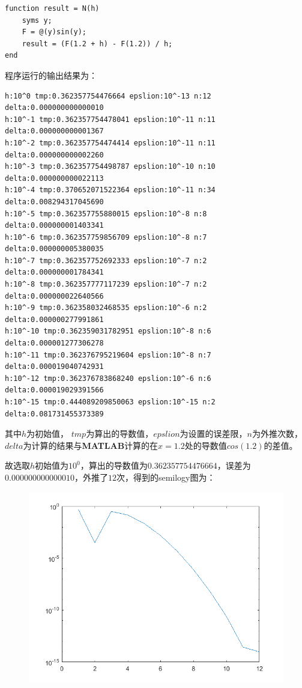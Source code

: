 \documentclass[12pt,a4paper,UTF8]{ctexart}
\theoremstyle{nonumberplain}
\begin{document}
\begin{enumerate}
\begin{enumerate}
\begin{lstlisting}[frame=single]
function result = N(h)
    syms y;
    F = @(y)sin(y);
    result = (F(1.2 + h) - F(1.2)) / h;
end
\end{lstlisting}
\par 程序运行的输出结果为：
\begin{lstlisting}[frame=single]
h:10^0 tmp:0.362357754476664 epslion:10^-13 n:12 delta:0.000000000000010
h:10^-1 tmp:0.362357754478041 epslion:10^-11 n:11 delta:0.000000000001367
h:10^-2 tmp:0.362357754474414 epslion:10^-11 n:11 delta:0.000000000002260
h:10^-3 tmp:0.362357754498787 epslion:10^-10 n:10 delta:0.000000000022113
h:10^-4 tmp:0.370652071522364 epslion:10^-11 n:34 delta:0.008294317045690
h:10^-5 tmp:0.362357755880015 epslion:10^-8 n:8 delta:0.000000001403341
h:10^-6 tmp:0.362357759856709 epslion:10^-8 n:7 delta:0.000000005380035
h:10^-7 tmp:0.362357752692333 epslion:10^-7 n:2 delta:0.000000001784341
h:10^-8 tmp:0.362357777117239 epslion:10^-7 n:2 delta:0.000000022640566
h:10^-9 tmp:0.362358032468535 epslion:10^-6 n:2 delta:0.000000277991861
h:10^-10 tmp:0.362359031782951 epslion:10^-8 n:6 delta:0.000001277306278
h:10^-11 tmp:0.362376795219604 epslion:10^-8 n:7 delta:0.000019040742931
h:10^-12 tmp:0.362376783868240 epslion:10^-6 n:6 delta:0.000019029391566
h:10^-15 tmp:0.444089209850063 epslion:10^-15 n:2 delta:0.081731455373389  
\end{lstlisting}
\par 其中$h$为初始值，
$tmp$为算出的导数值，$epslion$为设置的误差限，$n$为外推次数，$delta$为计算的结果与\textbf{MATLAB}计算的在$x=1.2$处的导数值$cos(1.2)$的差值。
\par 故选取$h$初始值为$10^0$，算出的导数值为$0.362357754476664$，误差为$0.000000000000010$，外推了$12$次，得到的semilogy图为：
\begin{figure}[H]
    \centering
    \includegraphics[scale=0.45]{1_3.png}

\end{figure}
\end{enumerate}
\end{enumerate}
\end{document}
